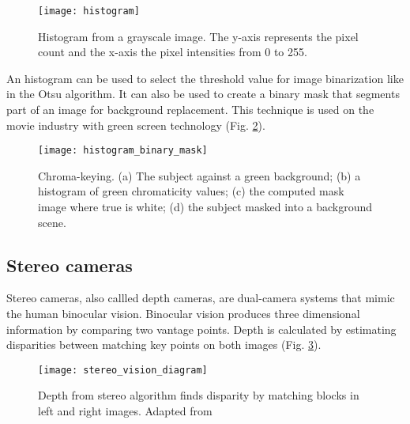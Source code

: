 \begin{figure}[htbp]
	\centering
	\texttt{[image: histogram]}
	\caption[Histogram from a grayscale image.]{Histogram from a grayscale image. The y-axis represents the pixel count and the x-axis the pixel intensities from 0 to 255.}
	\label{fig:histogram}
\end{figure}

An histogram can be used to select the threshold value for image binarization like in the Otsu algorithm. It can also be used to create a binary mask that segments part of an image for background replacement. This technique is used on the movie industry with green screen technology (Fig. \ref{fig:histogram_binary_mask}).

\begin{figure}[htbp]
	\centering
	\texttt{[image: histogram\_binary\_mask]}
	\caption[Chroma-keying.]{Chroma-keying. (a) The subject against a green background; (b) a histogram of green chromaticity values; (c) the computed mask image where true is white; (d) the subject masked into
a background scene. \cite{Corke2011_robotics_vision_control}}
	\label{fig:histogram_binary_mask}
\end{figure}



\subsection{Stereo cameras}
\label{subsec:stereo_cameras}

Stereo cameras, also callled depth cameras, are dual-camera systems that mimic the human binocular vision. Binocular vision produces three dimensional information by comparing two vantage points. Depth is calculated by estimating disparities between matching key points on both images (Fig. \ref{fig:stereo_vision_diagram}).

\begin{figure}[htbp]
	\centering
	\texttt{[image: stereo\_vision\_diagram]}
	\caption[Depth from stereo algorithm finds disparity by matching blocks in left and right images.]{Depth from stereo algorithm finds disparity by matching blocks in left and right images. Adapted from \cite{IntelRealSense_basics_depth_vision}}
	\label{fig:stereo_vision_diagram}
\end{figure}

